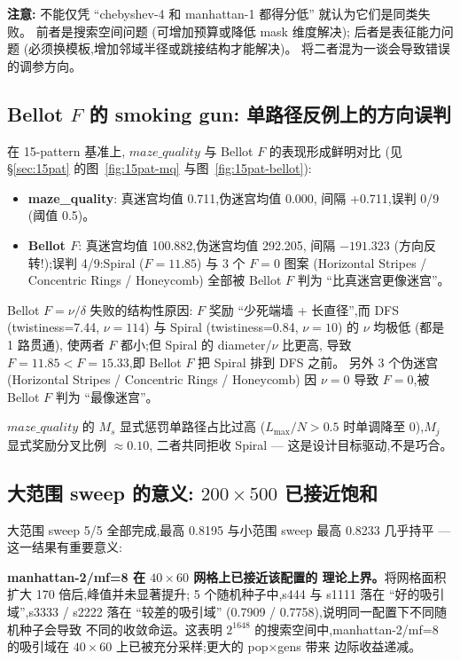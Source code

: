 \medskip\noindent\textbf{注意:}
不能仅凭 ``chebyshev-4 和 manhattan-1 都得分低'' 就认为它们是同类失败。
前者是搜索空间问题 (可增加预算或降低 mask 维度解决);
后者是表征能力问题 (必须换模板,增加邻域半径或跳接结构才能解决)。
将二者混为一谈会导致错误的调参方向。

\subsection{Bellot $F$ 的 smoking gun: 单路径反例上的方向误判}
\label{sec:bellot-smoking-gun}

在 15-pattern 基准上, $maze\_quality$ 与 Bellot $F$ 的表现形成鲜明对比
(见 §\ref{sec:15pat} 的图~\ref{fig:15pat-mq} 与图~\ref{fig:15pat-bellot}):

\begin{itemize}[itemsep=0pt, topsep=2pt]
  \item \textbf{maze\_quality}: 真迷宫均值 0.711,伪迷宫均值 0.000,
        间隔 +0.711,误判 0/9 (阈值 0.5)。
  \item \textbf{Bellot $F$}: 真迷宫均值 100.882,伪迷宫均值 292.205,
        间隔 $-191.323$ (方向反转!);误判 4/9:Spiral ($F=11.85$) 与 3 个
        $F=0$ 图案 (Horizontal Stripes / Concentric Rings / Honeycomb)
        全部被 Bellot $F$ 判为 ``比真迷宫更像迷宫''。
\end{itemize}

Bellot $F = \nu/\delta$ 失败的结构性原因:
$F$ 奖励 ``少死端墙 + 长直径'',而 DFS (twistiness=7.44, $\nu=114$)
与 Spiral (twistiness=0.84, $\nu=10$) 的 $\nu$ 均极低 (都是 1 路贯通),
使两者 $F$ 都小;但 Spiral 的 diameter/$\nu$ 比更高,
导致 $F=11.85 < F=15.33$,即 Bellot $F$ 把 Spiral 排到 DFS 之前。
另外 3 个伪迷宫 (Horizontal Stripes / Concentric Rings / Honeycomb)
因 $\nu=0$ 导致 $F=0$,被 Bellot $F$ 判为 ``最像迷宫''。

$maze\_quality$ 的 $M_s$ 显式惩罚单路径占比过高
($L_{\max}/N>0.5$ 时单调降至 0),$M_j$ 显式奖励分叉比例 $\approx 0.10$,
二者共同拒收 Spiral --- 这是设计目标驱动,不是巧合。

\subsection{大范围 sweep 的意义: $200\!\times\!500$ 已接近饱和}
\label{sec:big-sweep-meaning}

大范围 sweep 5/5 全部完成,最高 0.8195 与小范围 sweep 最高 0.8233
几乎持平 --- 这一结果有重要意义:

\noindent\textbf{manhattan-2/mf=8 在 $40\!\times\!60$ 网格上已接近该配置的
理论上界。}将网格面积扩大 170 倍后,峰值并未显著提升;
5 个随机种子中,s444 与 s1111 落在 ``好的吸引域'',s3333 / s2222 落在
``较差的吸引域'' (0.7909 / 0.7758),说明同一配置下不同随机种子会导致
不同的收敛命运。这表明 $2^{1648}$ 的搜索空间中,manhattan-2/mf=8
的吸引域在 $40\!\times\!60$ 上已被充分采样;更大的 pop$\times$gens 带来
边际收益递减。

